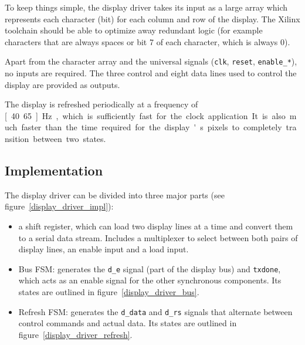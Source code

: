 \documentclass[a4paper]{article}
\begin{document}
To keep things simple, the display driver takes its input as a large array
which represents each character (\unit[8]{bit}) for each column and row of the
display. The Xilinx toolchain should be able to optimize away redundant logic
(for example characters that are always spaces or bit 7 of each character,
which is always 0).

Apart from the character array and the universal signals (\texttt{clk},
\texttt{reset}, \texttt{enable\_*}), no inputs are required. The three control
and eight data lines used to control the display are provided as outputs.

The display is refreshed periodically at a frequency of \unit[40.65]{Hz}, which
is sufficiently fast for the clock application. It is also much faster than the
time required for the display's pixels to completely transition between two
states.

\subsection{Implementation}

The display driver can be divided into three major parts (see figure~\ref{display_driver_impl}):

\begin{itemize}
	\item a shift register, which can load two display lines at a time and
	      convert them to a serial data stream. Includes a multiplexer to select
	      between both pairs of display lines, an enable input and a load input.
	\item Bus FSM: generates the \texttt{d\_e} signal (part of the display bus)
	      and \texttt{txdone}, which acts as an enable signal for the other
	      synchronous components. Its states are outlined in
	      figure~\ref{display_driver_bus}.
	\item Refresh FSM: generates the \texttt{d\_data} and \texttt{d\_rs} signals
	      that alternate between control commands and actual data. Its states
	      are outlined in figure~\ref{display_driver_refresh}.
\end{itemize}
\end{document}
